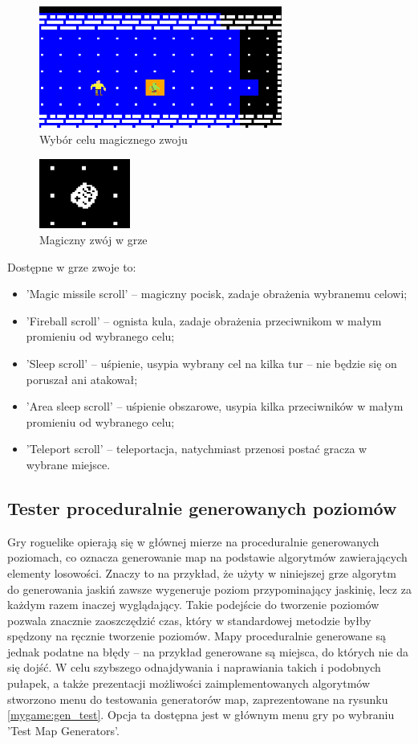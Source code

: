 \documentclass[12pt,twoside]{article}
\begin{document}
\FloatBarrier
\begin{figure}[ht]
	\centering
	\includegraphics[width=8cm]{images/mygame/targeting.png}
	\caption{Wybór celu magicznego zwoju}
	\label{mygame:targeting}
\end{figure}
\FloatBarrier

\FloatBarrier
\begin{figure}[ht]
	\centering
	\includegraphics[width=3cm]{images/mygame/scroll.png}
	\caption{Magiczny zwój w grze}
	\label{mygame:scroll}
\end{figure}
\FloatBarrier

Dostępne w grze zwoje to: 
\begin{itemize}
	\item 'Magic missile scroll' -- magiczny pocisk, zadaje obrażenia wybranemu celowi;
	\item 'Fireball scroll' -- ognista kula, zadaje obrażenia przeciwnikom w małym promieniu od wybranego celu;			
	\item 'Sleep scroll' -- uśpienie, usypia wybrany cel na kilka tur -- nie będzie się on poruszał ani atakował;
	\item 'Area sleep scroll' -- uśpienie obszarowe, usypia kilka przeciwników w małym promieniu od wybranego celu;
	\item 'Teleport scroll' -- teleportacja, natychmiast przenosi postać gracza w wybrane miejsce.	
\end{itemize}


\subsection{Tester proceduralnie generowanych poziomów}
Gry roguelike opierają się w głównej mierze na proceduralnie generowanych poziomach, co oznacza generowanie map na podstawie algorytmów zawierających elementy losowości. Znaczy to na przykład, że użyty w niniejszej grze algorytm do generowania jaskiń zawsze wygeneruje poziom przypominający jaskinię, lecz za każdym razem inaczej wyglądający. Takie podejście do tworzenie poziomów pozwala znacznie zaoszczędzić czas, który w standardowej metodzie byłby spędzony na ręcznie tworzenie poziomów. Mapy proceduralnie generowane są jednak podatne na błędy -- na przykład generowane są miejsca, do których nie da się dojść. W celu szybszego odnajdywania i naprawiania takich i podobnych pułapek, a także prezentacji możliwości zaimplementowanych algorytmów stworzono menu do testowania generatorów map, zaprezentowane na rysunku \ref{mygame:gen_test}. Opcja ta dostępna jest w głównym menu gry po wybraniu 'Test Map Generators'.
\end{document}
